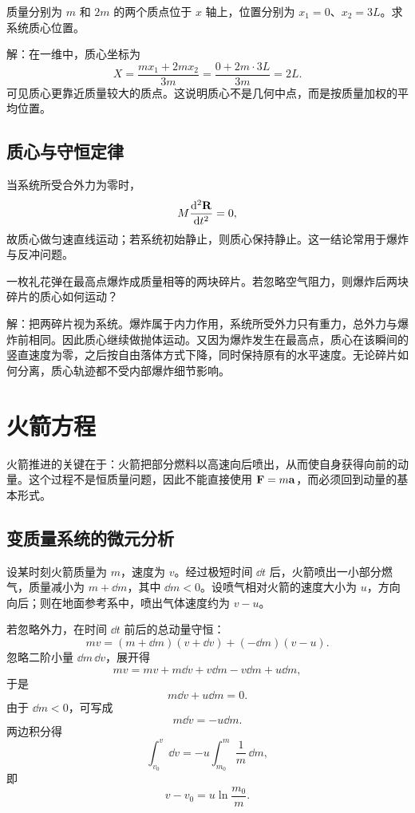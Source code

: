 \begin{example}
质量分别为 $m$ 和 $2m$ 的两个质点位于 $x$ 轴上，位置分别为 $x_1=0$、$x_2=3L$。求系统质心位置。

解：在一维中，质心坐标为
\[
X=\frac{mx_1+2mx_2}{3m}=\frac{0+2m\cdot 3L}{3m}=2L.
\]
可见质心更靠近质量较大的质点。这说明质心不是几何中点，而是按质量加权的平均位置。
\end{example}

\subsection{质心与守恒定律}

当系统所受合外力为零时，
\[
M\dv[2]{\vb R}{t}=0,
\]
故质心做匀速直线运动；若系统初始静止，则质心保持静止。这一结论常用于爆炸与反冲问题。

\begin{example}
一枚礼花弹在最高点爆炸成质量相等的两块碎片。若忽略空气阻力，则爆炸后两块碎片的质心如何运动？

解：把两碎片视为系统。爆炸属于内力作用，系统所受外力只有重力，总外力与爆炸前相同。因此质心继续做抛体运动。又因为爆炸发生在最高点，质心在该瞬间的竖直速度为零，之后按自由落体方式下降，同时保持原有的水平速度。无论碎片如何分离，质心轨迹都不受内部爆炸细节影响。
\end{example}

\section{火箭方程}

火箭推进的关键在于：火箭把部分燃料以高速向后喷出，从而使自身获得向前的动量。这个过程不是恒质量问题，因此不能直接使用 $\vb F=m\vb a$，而必须回到动量的基本形式。

\subsection{变质量系统的微元分析}

设某时刻火箭质量为 $m$，速度为 $v$。经过极短时间 $\dd t$ 后，火箭喷出一小部分燃气，质量减小为 $m+\dd m$，其中 $\dd m<0$。设喷气相对火箭的速度大小为 $u$，方向向后；则在地面参考系中，喷出气体速度约为 $v-u$。

若忽略外力，在时间 $\dd t$ 前后的总动量守恒：
\[
mv=(m+\dd m)(v+\dd v)+(-\dd m)(v-u).
\]
忽略二阶小量 $\dd m\,\dd v$，展开得
\[
mv=mv+m\dd v+v\dd m- v\dd m+u\dd m,
\]
于是
\[
m\dd v+u\dd m=0.
\]
由于 $\dd m<0$，可写成
\[
m\dd v=-u\dd m.
\]
两边积分得
\[
\int_{v_0}^{v}\dd v=-u\int_{m_0}^{m}\frac{1}{m}\,\dd m,
\]
即
\[
v-v_0=u\ln\frac{m_0}{m}.
\]

